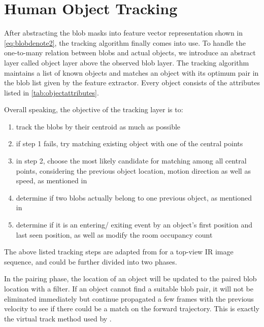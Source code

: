 \section{Human Object Tracking} \label{sec:track}
After abstracting the blob masks into feature vector representation shown in \autoref{eq:blobdenote2}, the tracking algorithm finally comes into use. To handle the one-to-many relation between blobs and actual objects, we introduce an abstract layer called object layer above the observed blob layer. The tracking algorithm maintains a list of known objects and matches an object with its optimum pair in the blob list given by the feature extractor. Every object consists of the attributes listed in \autoref{tab:objectattributes}.

 Overall speaking, the objective of the tracking layer is to:
\begin{enumerate}
  \item track the blobs by their centroid as much as possible
  \item if step 1 fails, try matching existing object with one of the central points
  \item in step 2, choose the most likely candidate for matching among all central points, considering the previous object location, motion direction as well as speed, as mentioned in 
  \item determine if two blobs actually belong to one previous object, as mentioned in 
  \item determine if it is an entering/ exiting event by an object's first position and last seen position, as well as modify the room occupancy count
\end{enumerate}

The above listed tracking steps are adapted from \cite{sharma2012blob} for a top-view IR image sequence, and could be further divided into two phases.

In the pairing phase, the location of an object will be updated to the paired blob location with a filter. If an object cannot find a suitable blob pair, it will not be eliminated immediately but continue propagated a few frames with the previous velocity to see if there could be a match on the forward trajectory. This is exactly the virtual track method used by \cite{virtualtrack}.

